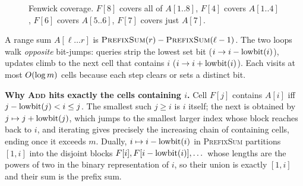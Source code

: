 \begin{figure}[H]
\centering
{}
\caption{Fenwick coverage. $F[8]$ covers all of $A[1..8]$, $F[4]$ covers $A[1..4]$,
$F[6]$ covers $A[5..6]$, $F[7]$ covers just $A[7]$.}
\label{ch23:fig-fenwick}
\end{figure}

\begin{algorithm}[H]
\DontPrintSemicolon
\caption{Fenwick operations on $F[1\ldots m]$ (all zero initially)}
\end{algorithm}

A range sum $A[\ell\ldots r]$ is $\textsc{PrefixSum}(r)-\textsc{PrefixSum}(\ell-1)$. The two
loops walk \emph{opposite} bit-jumps: queries strip the lowest set bit ($i \to i-\operatorname{lowbit}(i)$),
updates climb to the next cell that contains $i$ ($i \to i+\operatorname{lowbit}(i)$). Each visits at most
$O(\log m)$ cells because each step clears or sets a distinct bit.

\begin{whybox}
\textbf{Why \textsc{Add} hits exactly the cells containing $i$.} Cell $F[j]$ contains $A[i]$
iff $j-\operatorname{lowbit}(j) < i \le j$. The smallest such $j\ge i$ is $i$ itself; the next is obtained
by $j \mapsto j+\operatorname{lowbit}(j)$, which jumps to the smallest larger index whose block reaches
back to $i$, and iterating gives precisely the increasing chain of containing cells, ending
once it exceeds $m$. Dually, $i \mapsto i-\operatorname{lowbit}(i)$ in \textsc{PrefixSum} partitions $[1,i]$
into the disjoint blocks $F[i],F[i-\operatorname{lowbit}(i)],\dots$ whose lengths are the powers of two in
the binary representation of $i$, so their union is exactly $[1,i]$ and their sum is the
prefix sum.
\end{whybox}

